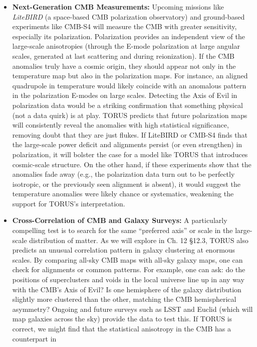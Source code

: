 \documentclass[]{article}
\begin{document}
\begin{itemize}
\item
  \textbf{Next-Generation CMB Measurements:} Upcoming missions like
  \emph{LiteBIRD} (a space-based CMB polarization observatory) and
  ground-based experiments like CMB-S4 will measure the CMB with greater
  sensitivity, especially its polarization. Polarization provides an
  independent view of the large-scale anisotropies (through the E-mode
  polarization at large angular scales, generated at last scattering and
  during reionization). If the CMB anomalies truly have a cosmic origin,
  they should appear not only in the temperature map but also in the
  polarization maps. For instance, an aligned quadrupole in temperature
  would likely coincide with an anomalous pattern in the polarization
  E-modes on large scales. Detecting the Axis of Evil in polarization
  data would be a striking confirmation that something physical (not a
  data quirk) is at play. TORUS predicts that future polarization maps
  will consistently reveal the anomalies with high statistical
  significance, removing doubt that they are just flukes. If LiteBIRD or
  CMB-S4 finds that the large-scale power deficit and alignments persist
  (or even strengthen) in polarization, it will bolster the case for a
  model like TORUS that introduces cosmic-scale structure. On the other
  hand, if these experiments show that the anomalies fade away (e.g.,
  the polarization data turn out to be perfectly isotropic, or the
  previously seen alignment is absent), it would suggest the temperature
  anomalies were likely chance or systematics, weakening the support for
  TORUS's interpretation.
\item
  \textbf{Cross-Correlation of CMB and Galaxy Surveys:} A particularly
  compelling test is to search for the same ``preferred axis'' or scale
  in the large-scale distribution of matter. As we will explore in Ch.
  12 §12.3, TORUS also predicts an unusual correlation pattern in galaxy
  clustering at enormous scales. By comparing all-sky CMB maps with
  all-sky galaxy maps, one can check for alignments or common patterns.
  For example, one can ask: do the positions of superclusters and voids
  in the local universe line up in any way with the CMB's Axis of Evil?
  Is one hemisphere of the galaxy distribution slightly more clustered
  than the other, matching the CMB hemispherical asymmetry? Ongoing and
  future surveys such as LSST and Euclid (which will map galaxies across
  the sky) provide the data to test this. If TORUS is correct, we might
  find that the statistical anisotropy in the CMB has a counterpart in

\end{itemize}
\end{document}
